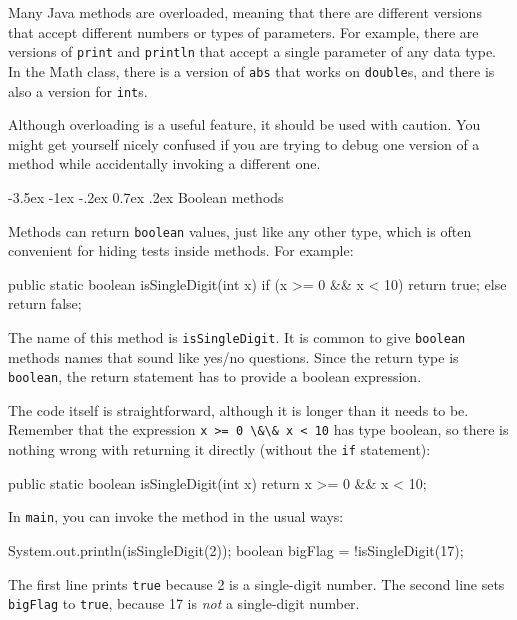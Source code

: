 \documentclass[12pt]{book}
\makeatletter
\theoremstyle{exercise}
\newcommand{\java}[1]{\verb"#1"}
\renewcommand{\section}{\@startsection{section}{1}{\z@}%
    {-3.5ex \@plus -1ex \@minus -.2ex}%
    {0.7ex \@plus.2ex}%
    {\normalfont\Large\bfseries}}
\newcommand{\java}[1]{\lstinline{#1}} %
\makeatother
\begin{document}
Many Java methods are overloaded, meaning that there are different versions that accept different numbers or types of parameters.
For example, there are versions of \java{print} and \java{println} that accept a single parameter of any data type.
In the Math class, there is a version of \java{abs} that works on \java{double}s, and there is also a version for \java{int}s.

Although overloading is a useful feature, it should be used with caution.
You might get yourself nicely confused if you are trying to debug one version of a method while accidentally invoking a different one.


\section{Boolean methods}
\label{boolean}


Methods can return \java{boolean} values, just like any other type, which is often convenient for hiding tests inside methods.
For example:

\begin{code}
    public static boolean isSingleDigit(int x) {
        if (x >= 0 && x < 10) {
            return true;
        } else {
            return false;
        }
    }
\end{code}

The name of this method is \java{isSingleDigit}.
It is common to give \java{boolean} methods names that sound like yes/no questions.
Since the return type is \java{boolean}, the return statement has to provide a boolean expression.

The code itself is straightforward, although it is longer than it needs to be.
Remember that the expression \java{x >= 0 \&\& x < 10} has type boolean, so there is nothing wrong with returning it directly (without the \java{if} statement):

\begin{code}
    public static boolean isSingleDigit(int x) {
        return x >= 0 && x < 10;
    }
\end{code}

In \java{main}, you can invoke the method in the usual ways:

\begin{code}
    System.out.println(isSingleDigit(2));
    boolean bigFlag = !isSingleDigit(17);
\end{code}

The first line prints \java{true} because 2 is a single-digit number.
The second line sets \java{bigFlag} to \java{true}, because 17 is {\em not} a single-digit number.
\end{document}
